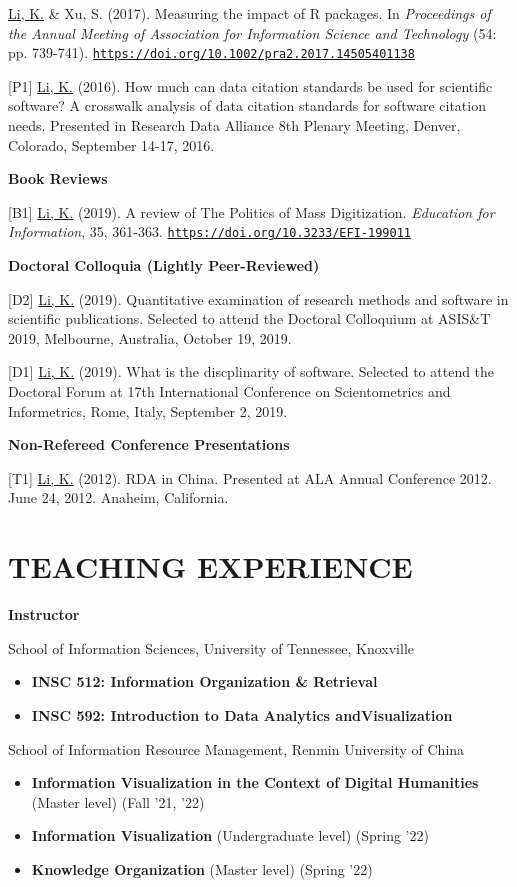 \documentclass[margin, 10pt]{res} %
\begin{document}
\begin{resume}
[P2] \underline{Li, K.} \& Xu, S. (2017). Measuring the impact of R packages. In \textit{Proceedings of the Annual Meeting of Association for Information Science and Technology} (54: pp. 739-741). \href{https://doi.org/10.1002/pra2.2017.14505401138}{\nolinkurl{https://doi.org/10.1002/pra2.2017.14505401138}}

[P1] \underline{Li, K.} (2016). How much can data citation standards be used for scientific software? A crosswalk analysis of data citation standards for software citation needs. Presented in Research Data Alliance 8th Plenary Meeting, Denver, Colorado, September 14-17, 2016.

\textbf{Book Reviews}

[B1] \underline{Li, K.} (2019). A review of The Politics of Mass Digitization. \textit{Education for Information}, 35, 361-363. \href{https://doi.org/10.3233/EFI-199011}{\nolinkurl{https://doi.org/10.3233/EFI-199011}}

\textbf{Doctoral Colloquia (Lightly Peer-Reviewed)}

[D2] \underline{Li, K.} (2019). Quantitative examination of research methods and software in scientific publications. Selected to attend the Doctoral Colloquium at ASIS\&T 2019, Melbourne, Australia, October 19, 2019.

[D1] \underline{Li, K.} (2019). What is the discplinarity of software. Selected to attend the Doctoral Forum at 17th International Conference on Scientometrics and Informetrics, Rome, Italy, September 2, 2019.

\textbf{Non-Refereed Conference Presentations}

[T1] \underline{Li, K.} (2012). RDA in China. Presented at ALA Annual Conference 2012. June 24, 2012. Anaheim, California.

\section{TEACHING EXPERIENCE}

\textbf{Instructor}

School of Information Sciences, University of Tennessee, Knoxville
\begin{itemize}
\item \textbf{INSC 512: Information Organization \& Retrieval}
\item \textbf{INSC 592: Introduction to Data Analytics andVisualization}
\end{itemize}

School of Information Resource Management, Renmin University of China
\begin{itemize}
\item \textbf{Information Visualization in the Context of Digital Humanities} (Master level) (Fall '21, '22)
\item \textbf{Information Visualization} (Undergraduate level) (Spring '22)
\item \textbf{Knowledge Organization} (Master level) (Spring '22)
\end{itemize}


\end{resume}
\end{document}
